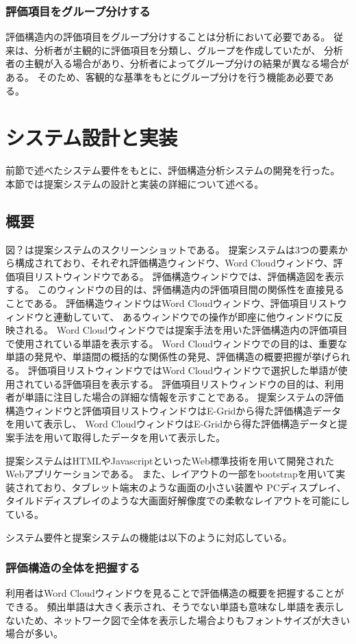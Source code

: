\documentclass[syuuron]{kuee}
\begin{document}
		\subsubsection{評価項目をグループ分けする}
			評価構造内の評価項目をグループ分けすることは分析において必要である。
			従来は、分析者が主観的に評価項目を分類し、グループを作成していたが、
			分析者の主観が入る場合があり、分析者によってグループ分けの結果が異なる場合がある。
			そのため、客観的な基準をもとにグループ分けを行う機能あ必要である。
	\section{システム設計と実装}
		前節で述べたシステム要件をもとに、評価構造分析システムの開発を行った。
		本節では提案システムの設計と実装の詳細について述べる。
		\subsection{概要}
			図？は提案システムのスクリーンショットである。
			提案システムは3つの要素から構成されており、それぞれ評価構造ウィンドウ、Word Cloudウィンドウ、評価項目リストウィンドウである。
			評価構造ウィンドウでは、評価構造図を表示する。
			このウィンドウの目的は、評価構造内の評価項目間の関係性を直接見ることである。
			評価構造ウィンドウはWord Cloudウィンドウ、評価項目リストウィンドウと連動していて、
			あるウィンドウでの操作が即座に他ウィンドウに反映される。
			Word Cloudウィンドウでは提案手法を用いた評価構造内の評価項目で使用されている単語を表示する。
			Word Cloudウィンドウでの目的は、重要な単語の発見や、単語間の概括的な関係性の発見、評価構造の概要把握が挙げられる。
			評価項目リストウィンドウではWord Cloudウィンドウで選択した単語が使用されている評価項目を表示する。
			評価項目リストウィンドウの目的は、利用者が単語に注目した場合の詳細な情報を示すことである。
			提案システムの評価構造ウィンドウと評価項目リストウィンドウはE-Gridから得た評価構造データを用いて表示し、
			Word CloudウィンドウはE-Gridから得た評価構造データと提案手法を用いて取得したデータを用いて表示した。
			
			提案システムはHTMLやJavascriptといったWeb標準技術を用いて開発されたWebアプリケーションである。
			また、レイアウトの一部をbootstrapを用いて実装されており、タブレット端末のような画面の小さい装置や
			PCディスプレイ、タイルドディスプレイのような大画面好解像度での柔軟なレイアウトを可能にしている。
			
			システム要件と提案システムの機能は以下のように対応している。
			\subsubsection{評価構造の全体を把握する}
				利用者はWord Cloudウィンドウを見ることで評価構造の概要を把握することができる。
				頻出単語は大きく表示され、そうでない単語も意味なし単語を表示しないため、ネットワーク図で全体を表示した場合よりもフォントサイズが大きい場合が多い。				
\end{document}
